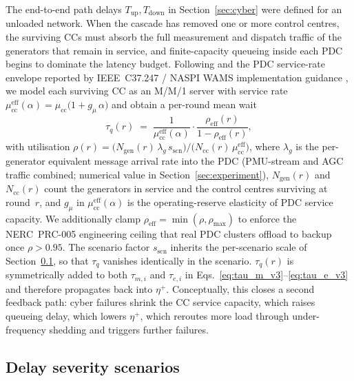 The end-to-end path delays $T_{\text{up}},T_{\text{down}}$ in
Section~\ref{sec:cyber} were defined for an unloaded network.  When
the cascade has removed one or more control centres, the surviving
CCs must absorb the full measurement and dispatch traffic of the
generators that remain in service, and finite-capacity queueing
inside each PDC begins to dominate the latency budget.  Following
\citet{Kleinrock1975} and the PDC service-rate envelope reported
by IEEE~C37.247 / NASPI WAMS implementation guidance
\citep{NASPI_LatencyGuidelines}, we model each surviving CC as an
M/M/1 server with service rate $\mu_{\text{cc}}^{\text{eff}}(\alpha)
=\mu_{\text{cc}}\bigl(1+g_{\mu}\,\alpha\bigr)$ and obtain a
per-round mean wait
\begin{equation}\label{eq:tauq}
  \tau_q(r) \;=\; \frac{1}{\mu_{\text{cc}}^{\text{eff}}(\alpha)}\cdot
                 \frac{\rho_{\text{eff}}(r)}{1-\rho_{\text{eff}}(r)},
\end{equation}
with utilisation
$\rho(r)=\bigl(N_{\text{gen}}(r)\,\lambda_g\,s_{\text{scn}}\bigr)/\bigl(N_{\text{cc}}(r)\,\mu_{\text{cc}}^{\text{eff}}\bigr)$,
where $\lambda_g$ is the per-generator equivalent message arrival rate
into the PDC (PMU-stream and AGC traffic combined; numerical value
in Section~\ref{sec:experiment}), $N_{\text{gen}}(r)$ and
$N_{\text{cc}}(r)$ count the generators in service and the
control centres surviving at round~$r$, and $g_{\mu}$ in
$\mu_{\text{cc}}^{\text{eff}}(\alpha)$ is the operating-reserve
elasticity of PDC service capacity.  We additionally clamp
$\rho_{\text{eff}}=\min(\rho,\rho_{\max})$ to enforce the
NERC~PRC-005 engineering ceiling that real PDC clusters offload to
backup once $\rho>0.95$.  The scenario factor $s_{\text{scn}}$
inherits the per-scenario scale of Section~\ref{sec:scenarios}, so
that $\tau_q$ vanishes identically in the \nodelay{} scenario.
$\tau_q(r)$ is symmetrically added to both $\tau_{m,i}$ and
$\tau_{e,i}$ in Eqs.~\eqref{eq:tau_m_v3}--\eqref{eq:tau_e_v3} and
therefore propagates back into $\eta^{+}$.  Conceptually, this
closes a second feedback path: cyber failures shrink the CC
service capacity, which raises queueing delay, which lowers
$\eta^{+}$, which reroutes more load through under-frequency
shedding and triggers further failures.

\subsection{Delay severity scenarios}\label{sec:scenarios}

